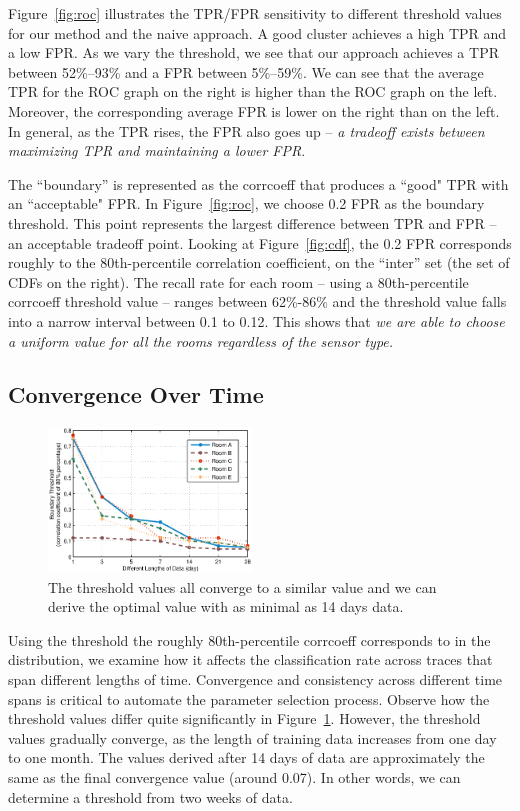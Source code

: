 Figure~\ref{fig:roc} illustrates the TPR/FPR sensitivity to different threshold values for our method and the naive approach. A good cluster achieves a high TPR and a low FPR. 
As we vary the threshold, we see that our approach 
achieves a TPR between 52\%--93\% and a FPR between 5\%--59\%.  %
We can see that the average TPR for the ROC graph on the right is higher than the 
ROC graph on the left.  Moreover, the corresponding average FPR is lower on the right than on the left.
In general, as the TPR rises, the FPR also goes up -- \emph{a tradeoff exists between maximizing TPR and maintaining a lower FPR}.


 The ``boundary'' is represented as the corrcoeff that produces a ``good" TPR with an ``acceptable" FPR.  In Figure~\ref{fig:roc}, 
  we choose 0.2 FPR as the boundary threshold.  This point represents the largest difference between TPR and FPR -- an acceptable tradeoff point. 
Looking at Figure~\ref{fig:cdf}, the 0.2 FPR corresponds roughly to the 80th-percentile correlation coefficient, on the ``inter''
set (the set of CDFs on the right).
  The recall rate for each room -- using a 80th-percentile corrcoeff threshold value -- ranges between 62\%-86\% and the 
  threshold value falls into a narrow interval between 0.1 to 0.12. This shows that \emph{we are able to choose a uniform value 
  for all the rooms regardless of the sensor type.}

\subsection{Convergence Over Time}
\begin{figure}[h!]
\centering
	\includegraphics[width=0.48\textwidth]{figs/lengtheffect.eps}
\caption{The threshold values all converge to a similar value and we can derive the optimal value with as minimal as 14 days data.}
\label{fig:leneff}
\end{figure}

Using the threshold the roughly 80th-percentile corrcoeff corresponds to in the distribution, we examine how it affects the classification rate across traces
that span different lengths of time.  Convergence and consistency across different time spans is critical to automate the parameter selection
process.
Observe how the  threshold values differ quite significantly in Figure~\ref{fig:leneff}.  However, 
the threshold values 
gradually converge, as the length of training data increases from one day to one month.  The values derived after 14 days of data
are approximately the same as the final convergence value (around 0.07).  In other words, we can determine a threshold from two weeks of data.


